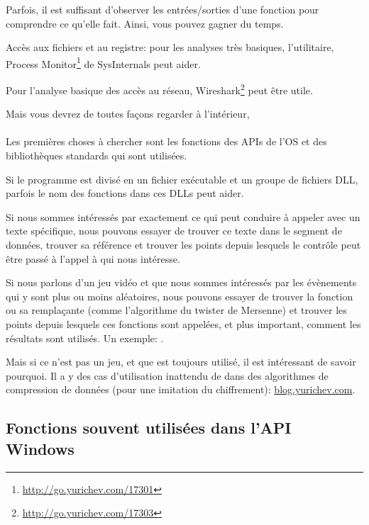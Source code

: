 
Parfois, il est suffisant d'observer les entrées/sorties d'une fonction pour comprendre
ce qu'elle fait.
Ainsi, vous pouvez gagner du temps.

Accès aux fichiers et au registre:
pour les analyses très basiques, l'utilitaire, Process Monitor\footnote{\url{http://go.yurichev.com/17301}}
de SysInternals peut aider.

Pour l'analyse basique des accès au réseau, Wireshark\footnote{\url{http://go.yurichev.com/17303}}
peut être utile.

Mais vous devrez de toutes façons regarder à l'intérieur, \\
\\
Les premières choses à chercher sont les fonctions des \ac{API}s de l'\ac{OS} et
des bibliothèques standards qui sont utilisées.

Si le programme est divisé en un fichier exécutable et un groupe de fichiers DLL,
parfois le nom des fonctions dans ces DLLs peut aider.

Si nous sommes intéressés par exactement ce qui peut conduire à appeler 
avec un texte spécifique, nous pouvons essayer de trouver ce texte dans le segment
de données, trouver sa référence et trouver les points depuis lesquels le contrôle
peut être passé à l'appel à  qui nous intéresse.

Si nous parlons d'un jeu vidéo et que nous sommes intéressés par les évènements qui
y sont plus ou moins aléatoires, nous pouvons essayer de trouver la fonction \rand
ou sa remplaçante (comme l'algorithme du twister de Mersenne) et trouver les points
depuis lesquels ces fonctions sont appelées, et plus important, comment les résultats
sont utilisés.
Un exemple: .

Mais si ce n'est pas un jeu, et que \rand est toujours utilisé, il est intéressant
de savoir pourquoi.
Il a y des cas d'utilisation inattendu de \rand dans des algorithmes de compression
de données (pour une imitation du chiffrement):
\href{http://go.yurichev.com/17221}{blog.yurichev.com}.

\subsection{Fonctions souvent utilisées dans l'API Windows}

